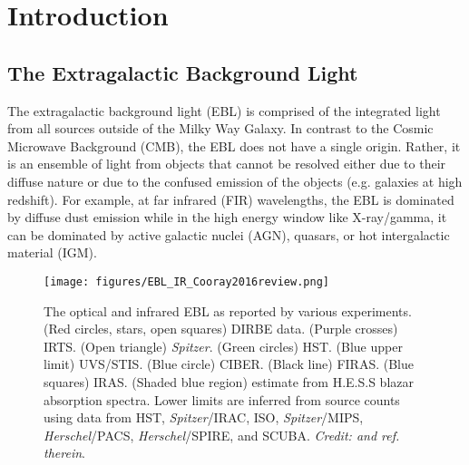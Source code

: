 \section{Introduction}
\subsection{The Extragalactic Background Light}
The extragalactic background light (EBL) is comprised of the integrated light from all sources outside of the Milky Way Galaxy. In contrast to the Cosmic Microwave Background (CMB), the EBL does not have a single origin. Rather, it is an ensemble of light from objects that cannot be resolved either due to their diffuse nature or due to the confused emission of the objects (e.g. galaxies at high redshift).
For example, at far infrared (FIR) wavelengths, the EBL is dominated by diffuse dust emission while in the high energy window like X-ray/gamma, it can be dominated by active galactic nuclei (AGN), quasars, or hot intergalactic material (IGM). 


\begin{figure}[h]
	\centering
	\texttt{[image: figures/EBL\_IR\_Cooray2016review.png]} 
	\caption[The optical and infrared EBL as reported by various experiments.]{The optical and infrared EBL as reported by various experiments. (Red circles, stars, open squares) DIRBE data. (Purple crosses) IRTS. (Open triangle) \textit{Spitzer}. (Green circles) HST. (Blue upper limit) UVS/STIS. (Blue circle) CIBER. (Black line) FIRAS. (Blue squares) IRAS. (Shaded blue region) estimate from H.E.S.S blazar absorption spectra. Lower limits are inferred from source counts using data from HST, \textit{Spitzer}/IRAC, ISO, \textit{Spitzer}/MIPS, \textit{Herschel}/PACS, \textit{Herschel}/SPIRE, and SCUBA. \textit{Credit: \citet{Cooray2016} and ref. therein}.\label{fig:EBL_IR}}
\end{figure}

